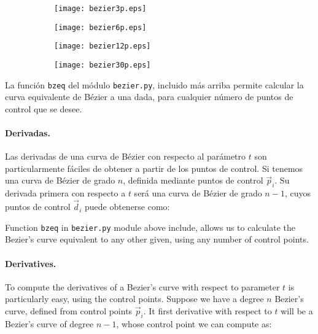 \begin{figure}[h]
\centering
\begin{subfigure}{0.45\textwidth}
	\texttt{[image: bezier3p.eps]}
	 \label{fig:bz1}
\end{subfigure}
\begin{subfigure}{0.45\textwidth}
	\texttt{[image: bezier6p.eps]}
	\label{fig:bz2}
\end{subfigure}
\begin{subfigure}{0.45\textwidth}
	\texttt{[image: bezier12p.eps]}
	\label{fig:bz3} 
\end{subfigure}
\begin{subfigure}{0.45\textwidth}
	\texttt{[image: bezier30p.eps]}
	 \label{fig:bz4}
\end{subfigure}
\label{fig:bzgrad}
\end{figure}
\begin{paracol}{2}
La función \texttt{bzeq} del módulo \texttt{bezier.py}, incluido más arriba  permite calcular la curva equivalente de Bézier a una dada, para cualquier número de puntos de control que se desee. 
\paragraph{Derivadas.} Las derivadas de una curva de Bézier con respecto al parámetro $t$ son particularmente fáciles de obtener a partir de los puntos de control. Si tenemos una curva de Bézier de grado $n$, definida mediante puntos de control $\vec{p}_i$. Su derivada primera con respecto a $t$ será una curva de Bézier de grado $n-1$, cuyos puntos de control $\vec{d}_i$  puede obtenerse como:

\switchcolumn
Function \texttt{bzeq} in \texttt{bezier.py} module above include, allows us to calculate the Bezier's curve equivalent to any other given, using any number of control points. 



\paragraph{Derivatives.} To compute the derivatives of a Bezier's curve  with respect to parameter $t$ is particularly easy, using the control points. Suppose we have a degree $n$ Bezier's curve, defined from control points $\vec{p}_i$. It first derivative with respect to $t$ will be a Bezier's curve of degree $n-1$, whose control point we can compute as: 
\end{paracol}

